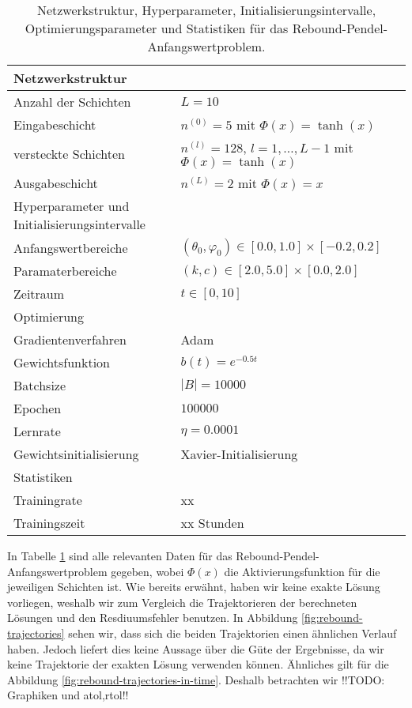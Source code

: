 \begin{table}
       \renewcommand{\arraystretch}{1.0}
       \centering
       \begin{tabular}{ l | l }
              \hline
              Netzwerkstruktur & \\
              \hline
              Anzahl der Schichten & $L=10$ \\
              Eingabeschicht & $n^{(0)}=5$ mit $\Phi(x)=\tanh(x)$ \\
              versteckte Schichten & $n^{(l)}=128$, $l = 1, \dots, L-1$ mit $\Phi(x)=\tanh(x)$ \\
              Ausgabeschicht & $n^{(L)}=2$ mit $\Phi(x)=x$ \\
              \hline
              Hyperparameter und Initialisierungsintervalle & \\
              \hline
              Anfangswertbereiche & $(\theta_0, \varphi_0) \in [0.0, 1.0] \times [-0.2, 0.2]$ \\
              Paramaterbereiche & $(k, c) \in [2.0, 5.0] \times [0.0, 2.0]$ \\
              Zeitraum & $t \in [0, 10]$ \\
              \hline
              Optimierung & \\
              \hline
              Gradientenverfahren & Adam \\
              Gewichtsfunktion & $b(t)=e^{-0.5t}$ \\
              Batchsize & $|B|=10000$ \\
              Epochen & $100000$ \\
              Lernrate & $\eta= 0.0001$ \\
              Gewichtsinitialisierung & Xavier-Initialisierung \\
              \hline
              Statistiken & \\
              \hline
              Trainingrate & xx \\
              Trainingszeit & xx Stunden \\
              \hline
       \end{tabular}
       \caption{Netzwerkstruktur, Hyperparameter, Initialisierungsintervalle, Optimierungsparameter und Statistiken
       für das Rebound-Pendel-Anfangswertproblem.}
\label{rebound-pendulum-table}
\end{table}
In Tabelle \ref{rebound-pendulum-table} sind alle relevanten Daten für das Rebound-Pendel-Anfangswertproblem gegeben,
wobei $\Phi(x)$ die Aktivierungsfunktion für die jeweiligen Schichten ist. Wie bereits erwähnt, haben wir keine exakte
Lösung vorliegen, weshalb wir zum Vergleich die Trajektorieren der berechneten Lösungen und den Resdiuumsfehler benutzen.
In Abbildung \ref{fig:rebound-trajectories} sehen wir, dass sich die beiden Trajektorien einen ähnlichen Verlauf haben.
Jedoch liefert dies keine Aussage über die Güte der Ergebnisse, da wir keine Trajektorie der exakten Lösung verwenden
können. Ähnliches gilt für die Abbildung \ref{fig:rebound-trajectories-in-time}. Deshalb betrachten wir
!!TODO: Graphiken und atol,rtol!!

